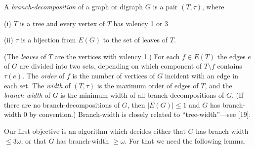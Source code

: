 
A \textit{branch-decomposition} of a graph or digraph $G$ is a pair $(T, \tau)$, where

\hspace*{12pt}(i) $T$ is a tree and every vertex of $T$ has valency 1 or 3

\hspace*{12pt}(ii) $\tau$ is a bijection from $E(G)$ to the set of leaves of $T$.

(The \textit{leaves} of $T$ are the vertices with valency 1.) For each $f \in E(T)$ the edges $e$ of $G$ are divided into two sets, depending on which component of $T \setminus f$ contains $\tau(e)$. The \textit{order} of $f$ is the number of vertices of $G$ incident with an edge in each set. The \textit{width} of $(T, \tau)$ is the maximum order of edges of $T$, and the \textit{branch-width} of $G$ is the minimum width of all branch-decompositions of $G$. (If there are no branch-decompositions of $G$, then $|E(G)| \le 1$ and $G$ has branch-width 0 by convention.) Branch-width is closely related to ``tree-width''---see [19].

Our first objective is an algorithm which decides either that $G$ has branch-width $\le 3\omega$, or that $G$ has branch-width $\ge \omega$. For that we need the following lemma.
